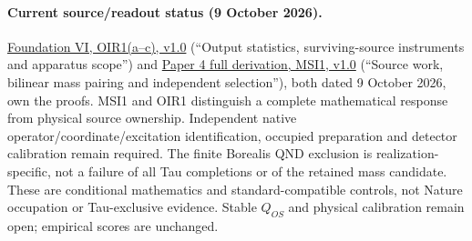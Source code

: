 \documentclass[11pt,a4paper]{article}
\theoremstyle{remark}
\begin{document}
\paragraph{Current source/readout status (9 October 2026).}
\href{https://github.com/tau-core-research/tau-core-quantum-readout-foundation-paper-vi/blob/main/paperVI_submission_source/main.pdf#nameddest=oir1}{Foundation VI, OIR1(a--c), v1.0} (``Output statistics, surviving-source instruments and apparatus scope'') and \href{https://github.com/tau-core-research/tau-core-higgs-module-paper4/blob/main/paper4_full_derivation/full_derivation.pdf#nameddest=msi1}{Paper 4 full derivation, MSI1, v1.0} (``Source work, bilinear mass pairing and independent selection''), both dated 9 October 2026, own the proofs.
MSI1 and OIR1 distinguish a complete mathematical response from physical source ownership. Independent native operator/coordinate/excitation identification, occupied preparation and detector calibration remain required. The finite Borealis QND exclusion is realization-specific, not a failure of all Tau completions or of the retained mass candidate.
These are conditional mathematics and standard-compatible controls, not Nature occupation or Tau-exclusive evidence. Stable $Q_{OS}$ and physical calibration remain open; empirical scores are unchanged.
\end{document}
